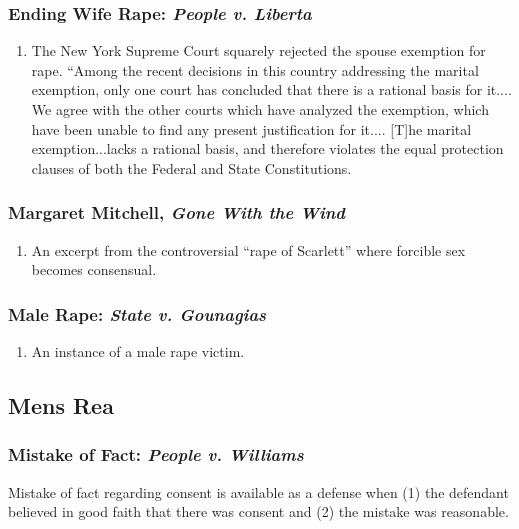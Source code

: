 \subsubsection{Ending Wife Rape: \emph{People v. Liberta}}

\begin{enumerate}
    \item The New York Supreme Court squarely rejected the spouse exemption 
    for rape.
    ``Among the recent decisions in this country addressing the marital 
    exemption, only one court has concluded that there is a rational basis for 
    it.... We agree with the other courts which have analyzed the exemption, 
    which have been unable to find any present justification for it.... [T]he 
    marital exemption...lacks a rational basis, and therefore violates the 
    equal protection clauses of both the Federal and State Constitutions.
\end{enumerate}

\subsubsection{Margaret Mitchell, \emph{Gone With the Wind}}

\begin{enumerate}
    \item An excerpt from the controversial ``rape of Scarlett'' where 
    forcible sex becomes consensual.
\end{enumerate}

\subsubsection{Male Rape: \emph{State v. Gounagias}}

\begin{enumerate}
    \item An instance of a male rape victim.
\end{enumerate}

\subsection{Mens Rea}

\subsubsection{Mistake of Fact: \emph{People v. Williams}}

Mistake of fact regarding consent is available as a defense when (1) the 
defendant believed in good faith that there was consent and (2) the mistake 
was reasonable.


